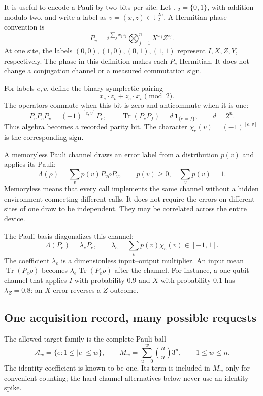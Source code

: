 \documentclass[11pt,a4paper]{article}
\numberwithin{equation}{section}
\theoremstyle{definition}
\theoremstyle{remark}
\begin{document}
It is useful to encode a Pauli by two bits per site. Let \(\mathbb F_2=\{0,1\}\), with addition modulo two, and write a label as \(v=(x,z)\in\mathbb F_2^{2n}\). A Hermitian phase convention is
\begin{equation}
 P_v=i^{\sum_jx_jz_j}\bigotimes_{j=1}^n X^{x_j}Z^{z_j}.
\end{equation}
At one site, the labels \((0,0),(1,0),(0,1),(1,1)\) represent \(I,X,Z,Y\), respectively. The phase in this definition makes each \(P_v\) Hermitian. It does not change a conjugation channel or a measured commutation sign.

For labels \(e,v\), define the binary symplectic pairing
\begin{equation}
 [e,v]=x_e\cdot z_v+z_e\cdot x_v \pmod 2.
\end{equation}
The operators commute when this bit is zero and anticommute when it is one:
\begin{equation}
 P_vP_eP_v=(-1)^{[e,v]}P_e,\qquad
 \operatorname{Tr}(P_eP_f)=d\,\mathbf 1_{\{e=f\}},\qquad d=2^n.
 \label{eq:plmt-pauli}
\end{equation}
Thus algebra becomes a recorded parity bit. The character
\(\chi_e(v)=(-1)^{[e,v]}\) is the corresponding sign.

A memoryless Pauli channel draws an error label from a distribution \(p(v)\) and applies its Pauli:
\begin{equation}
 \Lambda(\rho)=\sum_vp(v)P_v\rho P_v,\qquad p(v)\geq0,\quad\sum_vp(v)=1.
 \label{eq:plmt-channel}
\end{equation}
Memoryless means that every call implements the same channel without a hidden environment connecting different calls. It does not require the errors on different sites of one draw to be independent. They may be correlated across the entire device.

The Pauli basis diagonalizes this channel:
\begin{equation}
 \Lambda(P_e)=\lambda_eP_e,\qquad
 \lambda_e=\sum_vp(v)\chi_e(v)\in[-1,1].
 \label{eq:plmt-eigenvalue}
\end{equation}
The coefficient \(\lambda_e\) is a dimensionless input--output multiplier. An input mean \(\operatorname{Tr}(P_e\rho)\) becomes
\(\lambda_e\operatorname{Tr}(P_e\rho)\) after the channel. For instance, a one-qubit channel that applies \(I\) with probability \(0.9\) and \(X\) with probability \(0.1\) has \(\lambda_Z=0.8\): an \(X\) error reverses a \(Z\) outcome.

\subsection{One acquisition record, many possible requests}
The allowed target family is the complete Pauli ball
\begin{equation}
 \mathcal A_w=\{e:1\leq |e|\leq w\},\qquad
 M_w=\sum_{u=0}^w\binom nu3^u,\qquad 1\leq w\leq n.
 \label{eq:plmt-family}
\end{equation}
The identity coefficient is known to be one. Its term is included in \(M_w\) only for convenient counting; the hard channel alternatives below never use an identity spike.
\end{document}
